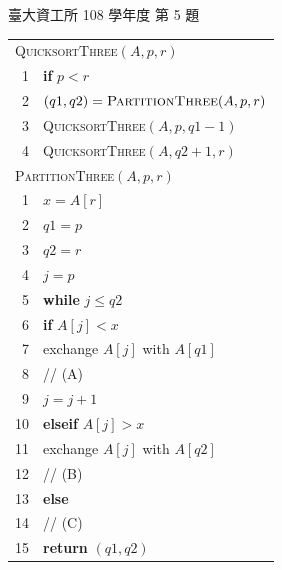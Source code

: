\begin{pastexam}[label={px:ntu-108-dsaa-05}]{臺大資工所 108 學年度 第 5 題}
\begin{center}
\begin{tabular}{rl}
\multicolumn{2}{l}{\textsc{QuicksortThree}$(A,p,r)$}\\
1 & \textbf{if} $p<r$\\
2 & \quad $(q1,q2)=\textsc{PartitionThree}(A,p,r)$\\
3 & \quad \textsc{QuicksortThree}$(A,p,q1-1)$\\
4 & \quad \textsc{QuicksortThree}$(A,q2+1,r)$\\[6pt]
\multicolumn{2}{l}{\textsc{PartitionThree}$(A,p,r)$}\\
1 & $x=A[r]$\\
2 & $q1=p$\\
3 & $q2=r$\\
4 & $j=p$\\
5 & \textbf{while} $j\le q2$\\
6 & \quad \textbf{if} $A[j]<x$\\
7 & \quad\quad exchange $A[j]$ with $A[q1]$\\
8 & \quad\quad // (A)\\
9 & \quad\quad $j=j+1$\\
10 & \quad \textbf{elseif} $A[j]>x$\\
11 & \quad\quad exchange $A[j]$ with $A[q2]$\\
12 & \quad\quad // (B)\\
13 & \quad \textbf{else}\\
14 & \quad\quad // (C)\\
15 & \textbf{return} $(q1,q2)$
\end{tabular}
\end{center}
\end{pastexam}

